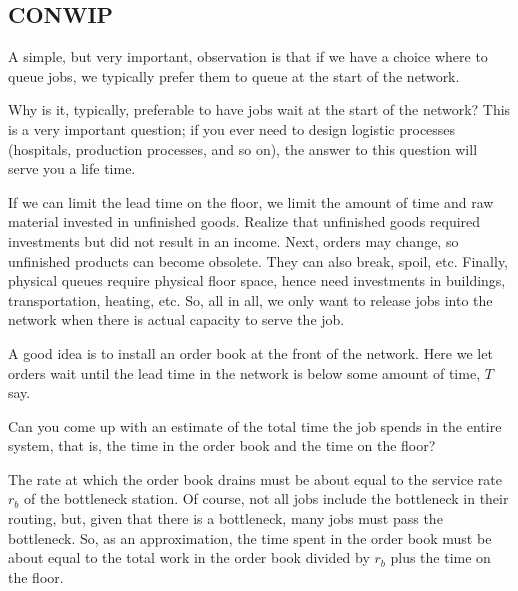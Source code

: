 \subsection{CONWIP}
\label{sec:conwip}

A simple, but very important, observation is that if we have a choice where to queue jobs, we typically prefer them to queue at the start of the network.

\begin{exercise}
  Why is it, typically, preferable to have jobs wait at the start of the network? This is a very important question; if you ever need to design logistic processes (hospitals, production processes, and so on), the answer to this question will serve you a life time. 
  \begin{solution}
    If we can limit the lead time on the floor, we limit the amount of time and raw material invested in unfinished goods. Realize that unfinished goods required investments but did not result in an income. Next, orders may change, so unfinished products can become obsolete. They can also break, spoil, etc. Finally, physical queues require physical floor space, hence need investments in buildings, transportation, heating, etc. So, all in all, we only want to release jobs into the network when there is actual capacity to serve the job.



  \end{solution}
\end{exercise}

A good idea is to  install an order book at the front of the network. Here we let orders wait until the lead time in the network is below some amount of time, $T$ say. 
  

\begin{exercise}
  Can you come up with an estimate of the total time the job spends in the entire system, that is, the time in the order book and the time on the floor?
  \begin{solution}
The rate at which the order book drains must be about equal to the service rate $r_b$ of the bottleneck station. Of course, not all jobs include the bottleneck in their routing, but, given that there is a bottleneck, many jobs must pass the bottleneck. So, as an approximation, the time spent in the order book must be about equal to the total work in the order book divided by $r_b$ plus the time on the floor.      
  \end{solution}
\end{exercise}

